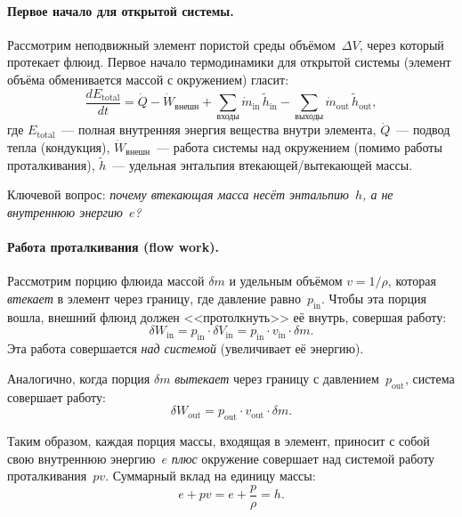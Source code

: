 \documentclass[12pt,a4paper]{article}
\begin{document}
\paragraph{Первое начало для открытой системы.}
Рассмотрим неподвижный элемент пористой среды объёмом~$\Delta V$,
через который протекает флюид. Первое начало термодинамики для
открытой системы (элемент объёма обменивается массой с окружением)
гласит:
\begin{equation}\label{eq:first_law_open}
  \frac{dE_{\mathrm{total}}}{dt}
  = \dot{Q} - \dot{W}_{\text{внешн}}
    + \sum_{\text{входы}} \dot{m}_{\mathrm{in}}\,
      \widetilde{h}_{\mathrm{in}}
    - \sum_{\text{выходы}} \dot{m}_{\mathrm{out}}\,
      \widetilde{h}_{\mathrm{out}},
\end{equation}
где $E_{\mathrm{total}}$~--- полная внутренняя энергия вещества внутри
элемента, $\dot{Q}$~--- подвод тепла (кондукция), $\dot{W}_{\text{внешн}}$~---
работа системы над окружением (помимо работы проталкивания),
$\widetilde{h}$~--- удельная энтальпия втекающей/вытекающей массы.

Ключевой вопрос: \emph{почему втекающая масса несёт энтальпию~$h$,
а не внутреннюю энергию~$e$?}

\paragraph{Работа проталкивания (flow work).}
Рассмотрим порцию флюида массой $\delta m$ и удельным объёмом
$v = 1/\rho$, которая \emph{втекает} в элемент через границу, где
давление равно~$p_{\mathrm{in}}$. Чтобы эта порция вошла, внешний
флюид должен <<протолкнуть>> её внутрь, совершая работу:
\[
  \delta W_{\mathrm{in}}
  = p_{\mathrm{in}} \cdot \delta V_{\mathrm{in}}
  = p_{\mathrm{in}} \cdot v_{\mathrm{in}} \cdot \delta m.
\]
Эта работа совершается \emph{над системой} (увеличивает её энергию).

Аналогично, когда порция $\delta m$ \emph{вытекает} через границу
с давлением~$p_{\mathrm{out}}$, система совершает работу:
\[
  \delta W_{\mathrm{out}}
  = p_{\mathrm{out}} \cdot v_{\mathrm{out}} \cdot \delta m.
\]

Таким образом, каждая порция массы, входящая в элемент, приносит с
собой свою внутреннюю энергию~$e$ \emph{плюс} окружение совершает
над системой работу проталкивания~$pv$. Суммарный вклад на единицу
массы:
\begin{equation}\label{eq:flow_work}
  e + pv = e + \frac{p}{\rho} = h.
\end{equation}
\end{document}
